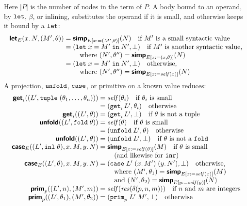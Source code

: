 Here $|P|$ is the number of nodes in the term of $P$. A body bound to an
operand, by $\mathtt{let}$, $\beta$, or inlining, substitutes the operand
if it is small, and otherwise keeps it bound by a $\mathtt{let}$:
\[
\begin{array}{@{}r@{\;}c@{\;}l@{}}
  \pass{let}_E(x.\,N, (M', \theta)) & = & \pass{simp}_{E[x:=(M', \theta)]}(N)
    \quad \text{if } M' \text{ is a small syntactic value}\\
  & = & (\kw{let}\;x = M'\;\kw{in}\;N', \bot)
    \quad \text{if } M' \text{ is another syntactic value,}\\
  & & \quad \text{where } (N', \theta'') = \pass{simp}_{E[x:=(x, \theta)]}(N)\\
  & = & (\kw{let}\;x = M'\;\kw{in}\;N', \bot)
    \quad \text{otherwise,}\\
  & & \quad \text{where } (N', \theta'') = \pass{simp}_{E[x:=\mathit{self}(x)]}(N)
\end{array}
\]
A projection, $\mathtt{unfold}$, $\mathtt{case}$, or primitive on a known value
reduces:
\[
\begin{array}{@{}r@{\;}c@{\;}l@{}}
  \pass{get}_i((L', \kw{tuple}\;(\theta_1, \ldots, \theta_n))) & = & \mathit{self}(\theta_i)
    \quad \text{if } \theta_i \text{ is small}\\
  & = & (\kw{get}_i\,L', \theta_i) \quad \text{otherwise}\\
  \pass{get}_i((L', \theta)) & = & (\kw{get}_i\,L', \bot)
    \quad \text{if } \theta \text{ is not a tuple}\\
  \pass{unfold}((L', \kw{fold}\;\theta)) & = & \mathit{self}(\theta)
    \quad \text{if } \theta \text{ is small}\\
  & = & (\kw{unfold}\;L', \theta) \quad \text{otherwise}\\
  \pass{unfold}((L', \theta)) & = & (\kw{unfold}\;L', \bot)
    \quad \text{if } \theta \text{ is not a } \kw{fold}\\
  \pass{case}_E((L', \kw{inl}\;\theta), x.\,M, y.\,N) & = & \pass{simp}_{E[x:=\mathit{self}(\theta)]}(M)
    \quad \text{if } \theta \text{ is small}\\
  & & \quad \text{(and likewise for } \kw{inr}\text{)}\\
  \pass{case}_E((L', \theta), x.\,M, y.\,N) & = &
    (\kw{case}\;L'\;(x.\,M')\;(y.\,N'), \bot)
    \quad \text{otherwise,}\\
  & & \quad \text{where } (M', \theta_1) = \pass{simp}_{E[x:=\mathit{self}(x)]}(M)\\
  & & \quad \text{and } (N', \theta_2) = \pass{simp}_{E[y:=\mathit{self}(y)]}(N)\\
  \pass{prim}_p((L', n), (M', m)) & = & \mathit{self}(\mathit{res}(\delta(p, n, m)))
    \quad \text{if } n \text{ and } m \text{ are integers}\\
  \pass{prim}_p((L', \theta_1), (M', \theta_2)) & = & (\kw{prim}_p\;L'\;M', \bot)
    \quad \text{otherwise}
\end{array}
\]
